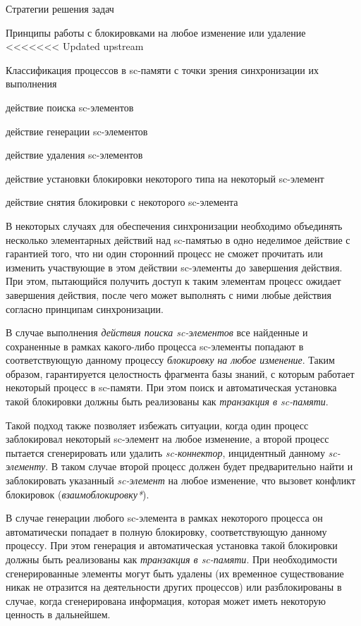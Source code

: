\begin{frame}{Стратегии решения задач}
\begin{frame}{\large Принципы работы с блокировками на любое изменение или удаление}
<<<<<<< Updated upstream
\begin{frame}{\large Классификация процессов в sc-памяти с точки зрения синхронизации их выполнения}
\vspace{15}
\begin{textitemize}
    \item{действие поиска sc-элементов}
	\item{действие генерации sc-элементов}
	\item{действие удаления sc-элементов}
	\item{действие установки блокировки некоторого типа на некоторый sc-элемент}
	\item{действие снятия блокировки с некоторого sc-элемента}
 \end{textitemize}
 В некоторых случаях для обеспечения синхронизации необходимо объединять несколько элементарных действий над sc-памятью в одно неделимое действие с гарантией того, что ни один сторонний процесс не сможет прочитать или изменить участвующие в этом действии sc-элементы до завершения действия. При этом, пытающийся получить доступ к таким элементам процесс ожидает завершения действия, после чего может выполнять с ними любые действия согласно принципам синхронизации.
\end{frame}

В случае выполнения \textit{действия поиска sc-элементов} все найденные и сохраненные в рамках какого-либо процесса sc-элементы попадают в соответствующую данному процессу \textit{блокировку на любое изменение}. Таким образом, гарантируется целостность фрагмента базы знаний, с которым работает некоторый процесс в sc-памяти. При этом поиск и автоматическая установка такой блокировки должны быть реализованы как \textit{транзакция в sc-памяти}.
	
Такой подход также позволяет избежать ситуации, когда один процесс заблокировал некоторый sc-элемент на любое изменение, а второй процесс пытается сгенерировать или удалить \textit{sc-коннектор}, инцидентный данному \textit{sc-элементу}. В таком случае второй процесс должен будет предварительно найти и заблокировать указанный \textit{sc-элемент} на любое изменение, что вызовет конфликт блокировок (\textit{взаимоблокировку*}).

В случае генерации любого sc-элемента в рамках некоторого процесса он автоматически попадает в полную блокировку, соответствующую данному процессу. При этом генерация и автоматическая установка такой блокировки должны быть реализованы как \textit{транзакция в sc-памяти}. При необходимости сгенерированные элементы могут быть удалены (их временное существование никак не отразится на деятельности других процессов) или разблокированы в случае, когда сгенерирована информация, которая может иметь некоторую ценность в дальнейшем.


\end{frame}
\end{frame}
